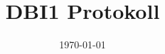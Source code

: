 \usepackage[ngerman]{datetime}
\usepackage{listings}
\usepackage{color}
\usepackage{fancyhdr}
\usepackage{pgffor}


\title{DBI1 Protokoll}
\author{}
\date{\myformat\today}

\pagestyle{fancy}
\fancyhead{}
\fancyhead[L]{\color[rgb]{.5,.5,.5}{}}
\fancyfoot[R]{}

\setlength{\headheight}{30pt}

